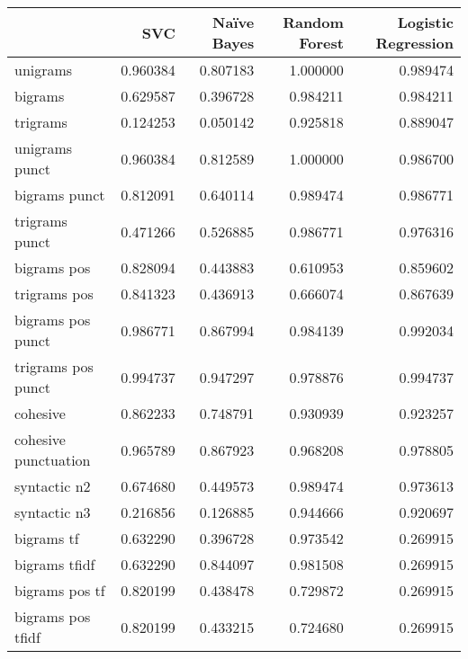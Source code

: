 \begin{tabular}{lrrrr}
\toprule
{} &       SVC &  Naïve Bayes &  Random Forest &  Logistic Regression \\
\midrule
unigrams                   &  0.960384 &     0.807183 &       1.000000 &             0.989474 \\
bigrams                    &  0.629587 &     0.396728 &       0.984211 &             0.984211 \\
trigrams                   &  0.124253 &     0.050142 &       0.925818 &             0.889047 \\
unigrams punct             &  0.960384 &     0.812589 &       1.000000 &             0.986700 \\
bigrams punct              &  0.812091 &     0.640114 &       0.989474 &             0.986771 \\
trigrams punct             &  0.471266 &     0.526885 &       0.986771 &             0.976316 \\
bigrams pos                &  0.828094 &     0.443883 &       0.610953 &             0.859602 \\
trigrams pos               &  0.841323 &     0.436913 &       0.666074 &             0.867639 \\
bigrams pos punct          &  0.986771 &     0.867994 &       0.984139 &             0.992034 \\
trigrams pos punct         &  0.994737 &     0.947297 &       0.978876 &             0.994737 \\
cohesive                   &  0.862233 &     0.748791 &       0.930939 &             0.923257 \\
cohesive punctuation       &  0.965789 &     0.867923 &       0.968208 &             0.978805 \\
syntactic n2               &  0.674680 &     0.449573 &       0.989474 &             0.973613 \\
syntactic n3               &  0.216856 &     0.126885 &       0.944666 &             0.920697 \\
bigrams tf                 &  0.632290 &     0.396728 &       0.973542 &             0.269915 \\
bigrams tfidf              &  0.632290 &     0.844097 &       0.981508 &             0.269915 \\
bigrams pos tf             &  0.820199 &     0.438478 &       0.729872 &             0.269915 \\
bigrams pos tfidf          &  0.820199 &     0.433215 &       0.724680 &             0.269915 \\

\end{tabular}
